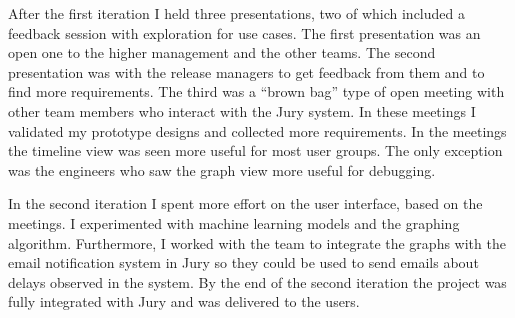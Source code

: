 After the first iteration I held three presentations, two of which included a feedback session with exploration for use cases. The first presentation was an open one to the higher management and the other teams. The second presentation was with the release managers to get feedback from them and to find more requirements. The third was a ``brown bag'' type of open meeting with other team members who interact with the Jury system.
In these meetings I validated my prototype designs and collected more requirements.
In the meetings the timeline view was seen more useful for most user groups.
The only exception was the engineers who saw the graph view more useful for debugging.

In the second iteration I spent more effort on the user interface, based on the meetings.
I experimented with machine learning models and the graphing algorithm.
Furthermore, I worked with the team to integrate the graphs with the email notification system in Jury so they could be used to send emails about delays observed in the system. 
By the end of the second iteration the project was fully integrated with Jury and was delivered to the users.